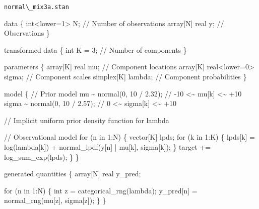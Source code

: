 \documentclass[
  letterpaper,
  DIV=11,
  numbers=noendperiod]{scrartcl}
\newenvironment{Shaded}{\begin{snugshade}}{\end{snugshade}}
\newcommand{\CommentTok}[1]{\textcolor[rgb]{0.37,0.37,0.37}{#1}}
\newcommand{\ControlFlowTok}[1]{\textcolor[rgb]{0.00,0.23,0.31}{#1}}
\newcommand{\DataTypeTok}[1]{\textcolor[rgb]{0.68,0.00,0.00}{#1}}
\newcommand{\DecValTok}[1]{\textcolor[rgb]{0.68,0.00,0.00}{#1}}
\newcommand{\FloatTok}[1]{\textcolor[rgb]{0.68,0.00,0.00}{#1}}
\newcommand{\KeywordTok}[1]{\textcolor[rgb]{0.00,0.23,0.31}{#1}}
\newcommand{\NormalTok}[1]{\textcolor[rgb]{0.00,0.23,0.31}{#1}}
\begin{document}
\begin{codelisting}

\caption{\texttt{normal\textbackslash\_mix3a.stan}}

\begin{Shaded}
\begin{Highlighting}[]
\KeywordTok{data}\NormalTok{ \{}
  \DataTypeTok{int}\NormalTok{\textless{}}\KeywordTok{lower}\NormalTok{=}\DecValTok{1}\NormalTok{\textgreater{} N;  }\CommentTok{// Number of observations}
  \DataTypeTok{array}\NormalTok{[N] }\DataTypeTok{real}\NormalTok{ y; }\CommentTok{// Observations}
\NormalTok{\}}

\KeywordTok{transformed data}\NormalTok{ \{}
  \DataTypeTok{int}\NormalTok{ K = }\DecValTok{3}\NormalTok{; }\CommentTok{// Number of components}
\NormalTok{\}}

\KeywordTok{parameters}\NormalTok{ \{}
  \DataTypeTok{array}\NormalTok{[K] }\DataTypeTok{real}\NormalTok{ mu;             }\CommentTok{// Component locations}
  \DataTypeTok{array}\NormalTok{[K] }\DataTypeTok{real}\NormalTok{\textless{}}\KeywordTok{lower}\NormalTok{=}\DecValTok{0}\NormalTok{\textgreater{} sigma; }\CommentTok{// Component scales}
  \DataTypeTok{simplex}\NormalTok{[K] lambda;            }\CommentTok{// Component probabilities}
\NormalTok{\}}

\KeywordTok{model}\NormalTok{ \{}
  \CommentTok{// Prior model}
\NormalTok{  mu \textasciitilde{} normal(}\DecValTok{0}\NormalTok{, }\DecValTok{10}\NormalTok{ / }\FloatTok{2.32}\NormalTok{);    }\CommentTok{// {-}10 \textless{}\textasciitilde{}  mu[k]   \textless{}\textasciitilde{} +10}
\NormalTok{  sigma \textasciitilde{} normal(}\DecValTok{0}\NormalTok{, }\DecValTok{10}\NormalTok{ / }\FloatTok{2.57}\NormalTok{); }\CommentTok{//   0 \textless{}\textasciitilde{} sigma[k] \textless{}\textasciitilde{} +10}

  \CommentTok{// Implicit uniform prior density function for lambda}

  \CommentTok{// Observational model}
  \ControlFlowTok{for}\NormalTok{ (n }\ControlFlowTok{in} \DecValTok{1}\NormalTok{:N) \{}
    \DataTypeTok{vector}\NormalTok{[K] lpds;}
    \ControlFlowTok{for}\NormalTok{ (k }\ControlFlowTok{in} \DecValTok{1}\NormalTok{:K) \{}
\NormalTok{      lpds[k] = log(lambda[k]) + normal\_lpdf(y[n] | mu[k], sigma[k]);}
\NormalTok{    \}}
    \KeywordTok{target +=}\NormalTok{ log\_sum\_exp(lpds);}
\NormalTok{  \}}
\NormalTok{\}}

\KeywordTok{generated quantities}\NormalTok{ \{}
  \DataTypeTok{array}\NormalTok{[N] }\DataTypeTok{real}\NormalTok{ y\_pred;}

  \ControlFlowTok{for}\NormalTok{ (n }\ControlFlowTok{in} \DecValTok{1}\NormalTok{:N) \{}
    \DataTypeTok{int}\NormalTok{ z = categorical\_rng(lambda);}
\NormalTok{    y\_pred[n] = normal\_rng(mu[z], sigma[z]);}
\NormalTok{  \}}
\NormalTok{\}}
\end{Highlighting}
\end{Shaded}

\end{codelisting}
\end{document}
